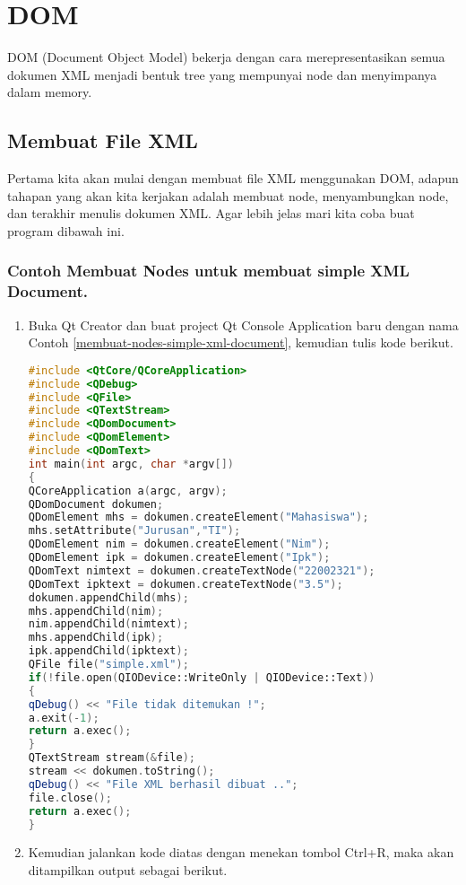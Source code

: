 \section{DOM}\label{dom}

DOM (Document Object Model) bekerja dengan cara merepresentasikan semua
dokumen XML menjadi bentuk tree yang mempunyai node dan menyimpanya
dalam memory.

\subsection{Membuat File XML}\label{membuat-file-xml}

Pertama kita akan mulai dengan membuat file XML menggunakan DOM, adapun
tahapan yang akan kita kerjakan adalah membuat node, menyambungkan node,
dan terakhir menulis dokumen XML. Agar lebih jelas mari kita coba buat
program dibawah ini.

\subsubsection*{Contoh  Membuat Nodes untuk membuat simple XML Document.}

\begin{enumerate}

\item
  Buka Qt Creator dan buat project Qt Console Application baru dengan
  nama Contoh \ref{membuat-nodes-simple-xml-document}, kemudian tulis kode berikut.

\begin{lstlisting}[language=c++, caption=Membuat Nodes untuk membuat simple XML Document, label=membuat-nodes-simple-xml-document]
#include <QtCore/QCoreApplication>
#include <QDebug>
#include <QFile>
#include <QTextStream>
#include <QDomDocument>
#include <QDomElement>
#include <QDomText>
int main(int argc, char *argv[])
{
QCoreApplication a(argc, argv);
QDomDocument dokumen;
QDomElement mhs = dokumen.createElement("Mahasiswa");
mhs.setAttribute("Jurusan","TI");
QDomElement nim = dokumen.createElement("Nim");
QDomElement ipk = dokumen.createElement("Ipk");
QDomText nimtext = dokumen.createTextNode("22002321");
QDomText ipktext = dokumen.createTextNode("3.5");
dokumen.appendChild(mhs);
mhs.appendChild(nim);
nim.appendChild(nimtext);
mhs.appendChild(ipk);
ipk.appendChild(ipktext);
QFile file("simple.xml");
if(!file.open(QIODevice::WriteOnly | QIODevice::Text))
{
qDebug() << "File tidak ditemukan !";
a.exit(-1);
return a.exec();
}
QTextStream stream(&file);
stream << dokumen.toString();
qDebug() << "File XML berhasil dibuat ..";
file.close();
return a.exec();
}
\end{lstlisting}
\item
  Kemudian jalankan kode diatas dengan menekan tombol Ctrl+R, maka akan
  ditampilkan output sebagai berikut.
\end{enumerate}

